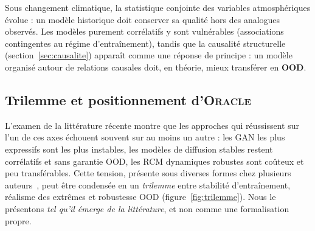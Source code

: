 \documentclass[14pt,a4paper,openany]{extreport}
\theoremstyle{definition}
\newcommand{\Oracle}{\textsc{Oracle}}
\begin{document}
Sous changement climatique, la statistique conjointe des variables atmosphériques évolue : un modèle historique doit conserver sa qualité hors des analogues observés. Les modèles purement corrélatifs y sont vulnérables (associations contingentes au régime d'entraînement), tandis que la causalité structurelle (section~\ref{sec:causalite}) apparaît comme une réponse de principe : un modèle organisé autour de relations causales doit, en théorie, mieux transférer en \textbf{OOD}.

\subsection{Trilemme et positionnement d'\Oracle{}}
\label{ssec:trilemme}

L'examen de la littérature récente montre que les approches qui réussissent sur l'un de ces axes échouent souvent sur au moins un autre : les GAN les plus expressifs sont les plus instables, les modèles de diffusion stables restent corrélatifs et sans garantie OOD, les RCM dynamiques robustes sont coûteux et peu transférables. Cette tension, présente sous diverses formes chez plusieurs auteurs~\cite{rampal_cgan_2024,mardani_corrdiff_2023,harris_2022}, peut être condensée en un \emph{trilemme} entre stabilité d'entraînement, réalisme des extrêmes et robustesse OOD (figure~\ref{fig:trilemme}). Nous le présentons \emph{tel qu'il émerge de la littérature}, et non comme une formalisation propre.
\end{document}
